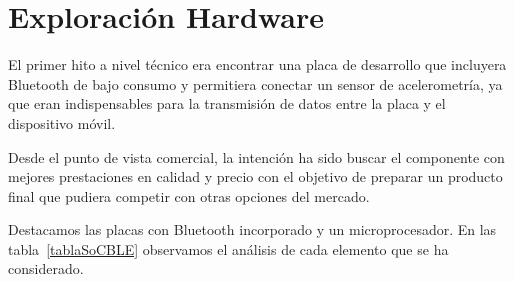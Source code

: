 
\cleardoublepage


\chapter{Exploración Hardware}
\label{makereference3}

El primer hito a nivel técnico era encontrar una placa de desarrollo que incluyera Bluetooth de bajo consumo y permitiera conectar un sensor de acelerometría, ya que eran indispensables para la transmisión de datos entre la placa y el dispositivo móvil. 

Desde el punto de vista comercial, la intención ha sido buscar el componente con mejores prestaciones en calidad y precio con el objetivo de preparar un producto final que pudiera competir con otras opciones del mercado.

Destacamos las placas con Bluetooth incorporado y un microprocesador. En las tabla~\ref{tablaSoCBLE} observamos el análisis de cada elemento que se ha considerado.

